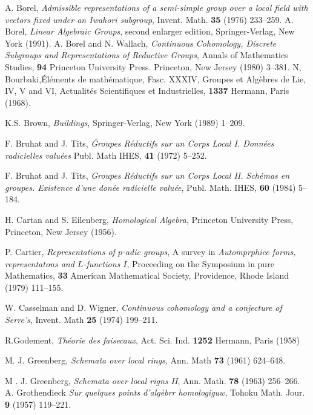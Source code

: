 \begin{thebibliography}{99}
 A. Borel, \textit{Admissible representations of a semi-simple group over a local field with vectors fixed under an Iwahori subgroup}, Invent. Math. {\bf 35} (1976) 233--259.
 A. Borel, \textit{Linear Algebraic Groups}, second enlarger edition, Springer-Verlag, New York (1991).
 A. Borel and N. Wallach, \textit{Continuous Cohomology, Discrete Subgroups and Representations of Reductive Groups}, Annals of Mathematics Studies, {\bf 94} Princeton University Press. Princeton, New Jersey (1980) 3--381.
 N, Bourbaki,\pageoriginale \'El\'ements de math\'ematique, Fasc. XXXIV, Groupes et Alg\`ebres de Lie, IV, V and VI, Actualit\'es Scientifiques et Industrielles, {\bf 1337} Hermann, Paris (1968).

 K.S. Brown, \textit{Buildings}, Springer-Verlag, New York (1989) 1--209.

 F. Bruhat and J. Tits, \textit{\'Groupes R\'eductifs sur un Corps Local I. Donn\'ees radicielles valu\'ees} Publ. Math IHES, {\bf 41} (1972) 5--252.

F. Bruhat and J. Tits, \textit{Groupes R\'eductifs sur un Corps Local II. Sch\'emas en groupes. Existence d'une don\'ee radicielle valu\'ee}, Publ. Math. IHES, {\bf 60} (1984) 5--184.

 H. Cartan and S. Eilenberg, \textit{Homological Algebra}, Princeton University Press, Princeton, New Jersey (1956).

 P. Cartier, \textit{Representations of $p$-adic groups}, A survey in \textit{Automprphice forms, representatons and $L$-functions $I$}, Proceeding on the Symposium in pure Mathematics, {\bf 33} American Mathematical Society, Providence, Rhode Island (1979) 111--155.

 W. Casselman and D. Wigner, \textit{Continuous cohomology and a conjecture of Serre's}, Invent. Math {\bf 25} (1974) 199--211.

 R.Godement, \textit{Th\'eorie des faisecaux}, Act. Sci. Ind. {\bf 1252} Hermann, Paris (1958)

 M. J. Greenberg, \textit{Schemata over local rings}, Ann. Math {\bf 73} (1961) 624--648.

 M . J. Greenberg, \textit{Schemata over local rigns II}, Ann. Math. {\bf 78} (1963)
256--266.
 A. Grothendieck \textit{Sur quelques points d'alg\`ebrr homologiguw}, Tohoku  Math. Jour. {\bf 9} (1957) 119--221.


\end{thebibliography}
